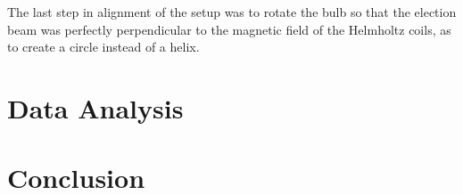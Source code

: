 \documentclass[aps,prl,10pt,twocolumn,floatfix]{revtex4-2}
\begin{document}
The last step in alignment of the setup was to rotate the bulb so that the election beam was perfectly perpendicular to the magnetic field of the Helmholtz coils, as to create a circle instead of a helix.

\section{Data Analysis}

\section{Conclusion}
\end{document}
